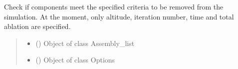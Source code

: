 \documentclass[letterpaper,10pt,english]{sphinxmanual}
\begin{document}
\begin{fulllineitems}
\label{\detokenize{modules:fragmentation.fragmentation}}
\pysigstartsignatures
{}
\pysigstopsignatures
\sphinxAtStartPar
Check if components meet the specified criteria to be removed from the simulation.
At the moment, only altitude, iteration number, time and total ablation are specified.
\begin{quote}\begin{description}
\begin{itemize}
\item {} 
\sphinxAtStartPar
{} ({\hyperref[\detokenize{modules:assembly.Assembly_list}]{}}) \textendash{} Object of class Assembly\_list

\item {} 
\sphinxAtStartPar
{} ({\hyperref[\detokenize{modules:configuration.Options}]{}}) \textendash{} Object of class Options

\end{itemize}

\end{description}\end{quote}

\end{fulllineitems}

\end{document}
